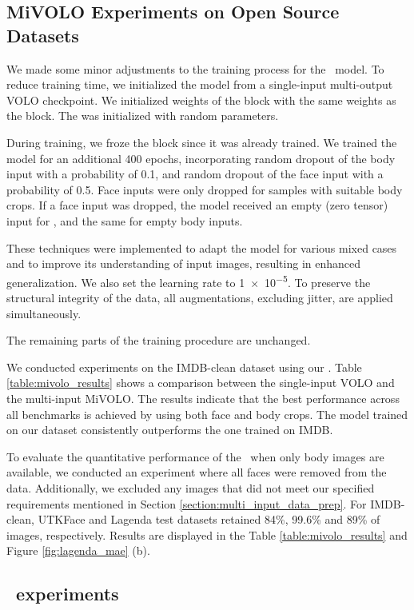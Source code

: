 \subsection{MiVOLO Experiments on Open Source Datasets}

We made some minor adjustments to the training process for the \ModelName\ model. To reduce training time, we initialized the model from a single-input multi-output VOLO checkpoint. We initialized weights of the  block with the same weights as the  block.  The  was initialized with random parameters.

During training, we froze the  block since it was already trained. We trained the model for an additional 400 epochs, incorporating random dropout of the body input with a probability of 0.1, and random dropout of the face input with a probability of 0.5. Face inputs were only dropped for samples with suitable body crops. If a face input was dropped, the model received an empty (zero tensor) input for , and the same for empty body inputs.

These techniques were implemented to adapt the model for various mixed cases and to improve its understanding of input images, resulting in enhanced generalization. We also set the learning rate to \num{1e-5}. To preserve the structural integrity of the data, all augmentations, excluding jitter, are applied simultaneously.

The remaining parts of the training procedure are unchanged.

We conducted experiments on the IMDB-clean dataset using our \ModelName. Table \ref{table:mivolo_results} shows a comparison between the single-input VOLO and the multi-input MiVOLO. The results indicate that the best performance across all benchmarks is achieved by using both face and body crops. The model trained on our dataset consistently outperforms the one trained on IMDB.


To evaluate the quantitative performance of the \ModelName\ when only body images are available, we conducted an experiment where all faces were removed from the data. Additionally, we excluded any images that did not meet our specified requirements mentioned in Section \ref{section:multi_input_data_prep}. For IMDB-clean, UTKFace and Lagenda test datasets retained 84\%, 99.6\% and 89\% of images, respectively. Results are displayed in the Table \ref{table:mivolo_results} and Figure \ref{fig:lagenda_mae} (b).

\subsection{\DatasetNameShort \ experiments}


